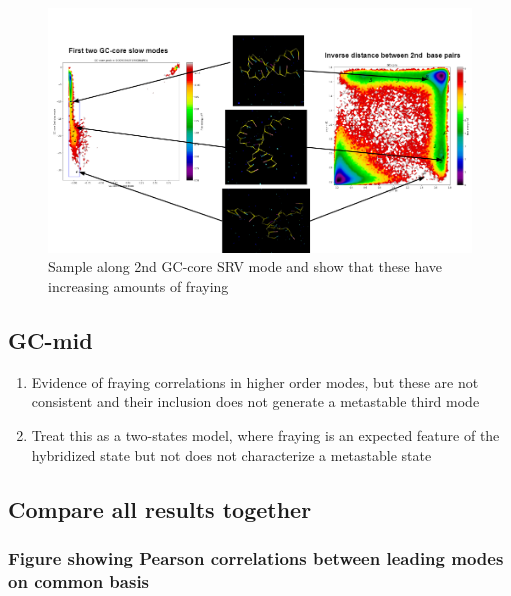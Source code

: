 \documentclass[journal=jpcbfk,manuscript=article]{achemso}
\begin{document}
\begin{figure}[ht!]
	\begin{center}
        \includegraphics[width=\textwidth]{Figs/skeleton/sample_fray.PNG}
        \caption{Sample along 2nd GC-core SRV mode and show that these have increasing amounts of fraying}
        \label{fig:sample_fray}
	\end{center}
\end{figure}

\subsection{\label{sec:Results}GC-mid}
\begin{enumerate}
	\item Evidence of fraying correlations in higher order modes, but these are not consistent and their inclusion does not generate a metastable third mode
	\item Treat this as a two-states model, where fraying is an expected feature of the hybridized state but not does not characterize a metastable state
\end{enumerate}  

\subsection{\label{sec:Results}Compare all results together}
\subsubsection{\label{sec:Results}Figure showing Pearson correlations between leading modes on common basis}
\end{document}
